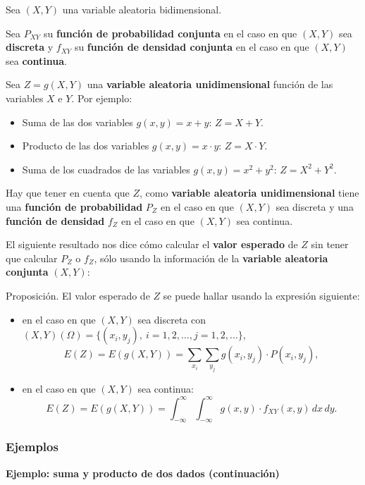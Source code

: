 \documentclass[
  letterpaper,
  DIV=11,
  numbers=noendperiod]{scrreprt}
\providecommand{\tightlist}{%
  \setlength{\itemsep}{0pt}\setlength{\parskip}{0pt}}\usepackage{longtable,booktabs,array}
\begin{document}
Sea \((X,Y)\) una variable aleatoria bidimensional.

Sea \(P_{XY}\) su \textbf{función de probabilidad conjunta} en el caso
en que \((X,Y)\) sea \textbf{discreta} y \(f_{XY}\) su \textbf{función
de densidad conjunta} en el caso en que \((X,Y)\) sea \textbf{continua}.

Sea \(Z=g(X,Y)\) una \textbf{variable aleatoria unidimensional} función
de las variables \(X\) e \(Y\). Por ejemplo:

\begin{itemize}
\tightlist
\item
  Suma de las dos variables \(g(x,y)=x+y\): \(Z=X+Y\).
\item
  Producto de las dos variables \(g(x,y)=x\cdot y\): \(Z=X\cdot Y\).
\item
  Suma de los cuadrados de las variables \(g(x,y)=x^2+y^2\):
  \(Z=X^2+Y^2\).
\end{itemize}

Hay que tener en cuenta que \(Z\), como \textbf{variable aleatoria
unidimensional} tiene una \textbf{función de probabilidad} \(P_Z\) en el
caso en que \((X,Y)\) sea discreta y una \textbf{función de densidad}
\(f_Z\) en el caso en que \((X,Y)\) sea continua.

El siguiente resultado nos dice cómo calcular el \textbf{valor esperado}
de \(Z\) sin tener que calcular \(P_Z\) o \(f_Z\), sólo usando la
información de la \textbf{variable aleatoria conjunta} \((X,Y)\):

Proposición. El valor esperado de \(Z\) se puede hallar usando la
expresión siguiente:

\begin{itemize}
\item
  en el caso en que \((X,Y)\) sea discreta con
  \((X,Y)(\Omega)=\{(x_i,y_j),\ i=1,2,\ldots, j=1,2,\ldots\}\), \[
  E(Z)  = E(g(X,Y))  =\sum_{x_i}\sum_{y_j}g(x_i,y_j)\cdot P(x_i,y_j),
  \]
\item
  en el caso en que \((X,Y)\) sea continua: \[
  E(Z)=E(g(X,Y))=\int_{-\infty}^\infty \int_{-\infty}^\infty g(x,y)\cdot f_{XY}(x,y)\, dx\, dy.
  \]
\end{itemize}

\hypertarget{ejemplos-3}{%
\subsubsection{Ejemplos}\label{ejemplos-3}}

\textbf{Ejemplo: suma y producto de dos dados (continuación)}
\end{document}
